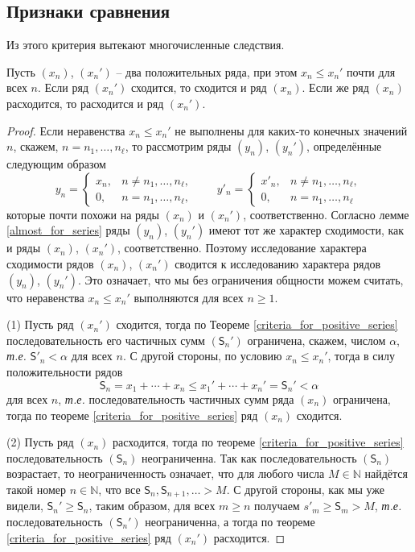 \subsection{Признаки сравнения}

Из этого критерия вытекают многочисленные следствия.

\begin{corollary}\label{cor1_for_series}
    Пусть $(x_n)$, $(x_n')$ -- два положительных ряда, при этом $x_n \le x_n'$ почти для всех $n$. Если ряд $(x_n')$ сходится, то сходится и ряд $(x_n)$. Если же ряд $(x_n)$ расходится, то расходится и ряд $(x_n').$
\end{corollary}
\begin{proof} 

 Если неравенства $x_n\le x_n'$ не выполнены для каких-то конечных значений $n$, скажем, $n = n_1,\ldots, n_\ell$, то рассмотрим ряды $(y_n)$, $(y_n')$, определённые следующим образом 
\[
 y_n = \begin{cases}
     x_n, & n \ne n_1,\ldots, n_\ell,\\
     0, & n = n_1,\ldots, n_\ell,
 \end{cases} \qquad  y'_n = \begin{cases}
     x'_n, & n \ne n_1,\ldots, n_\ell,\\
     0, & n = n_1,\ldots, n_\ell
 \end{cases} 
\]
которые почти похожи на ряды $(x_n)$ и $(x_n')$, соответственно. Согласно лемме \ref{almost_for_series} ряды $(y_n)$, $(y_n')$ имеют тот же характер сходимости, как и ряды $(x_n)$, $(x_n')$, соответственно. Поэтому исследование характера сходимости рядов $(x_n)$, $(x_n')$ сводится к исследованию характера рядов $(y_n)$, $(y_n')$. Это означает, что мы без ограничения общности можем считать, что неравенства $x_n \le x_n'$ выполняются для всех $n\ge 1.$

(1) Пусть ряд $(x_n')$ сходится, тогда по Теореме \ref{criteria_for_positive_series} последовательность его частичных сумм $(\mathsf{S}_n')$ ограничена, скажем, числом $\alpha$, \textit{т.е.} $\mathsf{S}'_n < \alpha$ для всех $n.$ С другой стороны, по условию $x_n \le x_n'$, тогда в силу положительности рядов
    \[
     \mathsf{S}_n = x_1 + \cdots + x_n \le x_1' + \cdots + x_n' = \mathsf{S}_n' < \alpha
    \]
    для всех $n$, \textit{т.е.} последовательность частичных сумм ряда $(x_n)$ ограничена, тогда по теореме \ref{criteria_for_positive_series} ряд $(x_n)$ сходится.

(2) Пусть ряд $(x_n)$ расходится, тогда по теореме \ref{criteria_for_positive_series} последовательность $(\mathsf{S}_n)$ неограниченна. Так как последовательность $(\mathsf{S}_n)$ возрастает, то неограниченность означает, что для любого числа $M \in \mathbb{N}$ найдётся такой номер $n\in \mathbb{N}$, что все $\mathsf{S}_n, \mathsf{S}_{n+1}, \ldots > M$. С другой стороны, как мы уже видели, $\mathsf{S}_n' \ge \mathsf{S}_n$, таким образом, для всех $m \ge n$ получаем $s'_m \ge \mathsf{S}_m > M$, \textit{т.е.} последовательность $(\mathsf{S}_n')$ неограниченна, а тогда по теореме \ref{criteria_for_positive_series} ряд $(x_n')$ расходится.
\end{proof}

